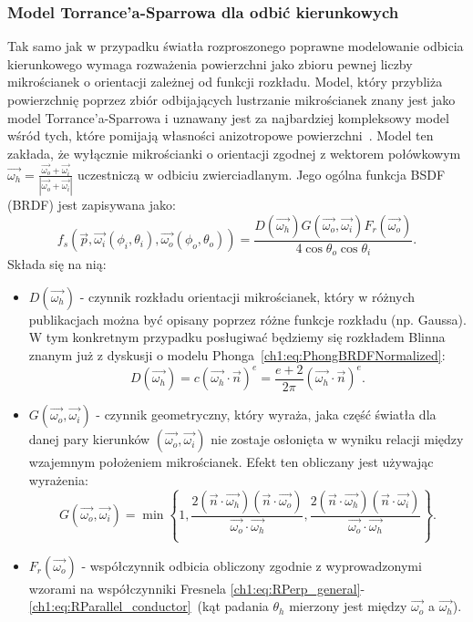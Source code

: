 \subsubsection{Model Torrance'a-Sparrowa dla odbić kierunkowych}
Tak samo jak w przypadku światła rozproszonego poprawne modelowanie odbicia kierunkowego wymaga rozważenia powierzchni jako zbioru pewnej liczby mikrościanek o orientacji zależnej od funkcji rozkładu. Model, który przybliża powierzchnię poprzez zbiór odbijających lustrzanie mikrościanek znany jest jako model Torrance'a-Sparrowa i uznawany jest za najbardziej kompleksowy model wśród tych, które pomijają własności anizotropowe powierzchni~\cite{Meister98investigationon}\cite{PBRT}. Model ten zakłada, że wyłącznie mikrościanki o orientacji zgodnej z wektorem połówkowym $\vec{\omega_h} = \frac{\vec{\omega_o} + \vec{\omega_i}}{|\vec{\omega_o} + \vec{\omega_i}|}$ uczestniczą w odbiciu zwierciadlanym.
Jego ogólna funkcja BSDF (BRDF) jest zapisywana jako:
\begin{equation}
f_s(\vec{p}, \vec{\omega_i}(\phi_i, \theta_i), \vec{\omega_o}(\phi_o, \theta_o)) = \frac{D(\vec{\omega_h})G(\vec{\omega_o}, \vec{\omega_i})F_r(\vec{\omega_o})}{4\cos\theta_o\cos\theta_i}.
\label{ch1:eq:TorranceSparrowFull}
\end{equation}
Składa się na nią:
\begin{itemize}
\item[] $D(\vec{\omega_h})$ - czynnik rozkładu orientacji mikrościanek, który w różnych publikacjach można być opisany poprzez różne funkcje rozkładu (np. Gaussa). W tym konkretnym przypadku posługiwać będziemy się rozkładem Blinna znanym już z dyskusji o modelu Phonga~\eqref{ch1:eq:PhongBRDFNormalized}:
\begin{equation}
D(\vec{\omega_h}) = c(\vec{\omega_h}\cdot\vec{n})^e = \frac{e + 2}{2\pi}(\vec{\omega_h}\cdot\vec{n})^e.
\end{equation}
\item[] $G(\vec{\omega_o}, \vec{\omega_i})$ - czynnik geometryczny, który wyraża, jaka część światła dla danej pary kierunków $(\vec{\omega_o}, \vec{\omega_i})$ nie zostaje osłonięta w wyniku relacji między wzajemnym położeniem mikrościanek. Efekt ten obliczany jest używając wyrażenia:
\begin{equation}
G(\vec{\omega_o}, \vec{\omega_i}) = \min\left\lbrace 1, \frac{2(\vec{n}\cdot\vec{\omega_h})(\vec{n}\cdot\vec{\omega_o})}{\vec{\omega_o}\cdot\vec{\omega_h}}, \frac{2(\vec{n}\cdot\vec{\omega_h})(\vec{n}\cdot\vec{\omega_i})}{\vec{\omega_o}\cdot\vec{\omega_h}} \right\rbrace.
\end{equation}
\item[] $F_r(\vec{\omega_o})$ - współczynnik odbicia obliczony zgodnie z wyprowadzonymi wzorami na współczynniki Fresnela \eqref{ch1:eq:RPerp_general}-\eqref{ch1:eq:RParallel_conductor}~(kąt padania $\theta_h$ mierzony jest między $\vec{\omega_o}$ a $\vec{\omega_h}$). 
\end{itemize}
